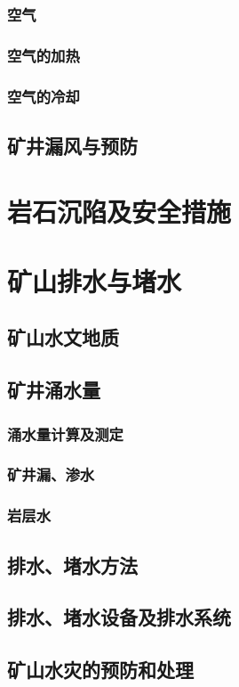\documentclass[UTF8]{../../ApplicationUniverse}
\begin{document}
        \subsubsection{空气}
        \subsubsection{空气的加热}
        \subsubsection{空气的冷却}
    \subsection{矿井漏风与预防}
\section{岩石沉陷及安全措施}
\section{矿山排水与堵水}
    \subsection{矿山水文地质}
    \subsection{矿井涌水量}
        \subsubsection{涌水量计算及测定}
        \subsubsection{矿井漏、渗水}
        \subsubsection{岩层水}
    \subsection{排水、堵水方法}
    \subsection{排水、堵水设备及排水系统}
    \subsection{矿山水灾的预防和处理}
\end{document}
